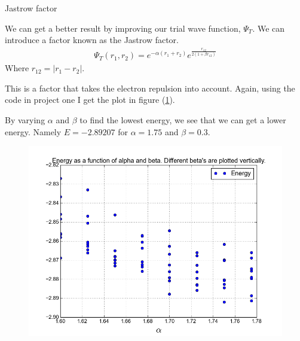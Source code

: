 \documentclass[a4paper, 12pt, titlepage]{article}
\begin{document}
\begin{section}{Jastrow factor}

 We can get a better result by improving our trial wave function, $\Psi_T$. We can introduce a factor known as the Jastrow factor. 
 \begin{align*}
 	\Psi_T(r_1,r_2) = e^{-\alpha(r_1 + r_2)}e^{\frac{r_{12}}{2(1+\beta r_{12})}}
 \end{align*}
 Where $r_{12} = |r_1 - r_2|$. 

 This is a factor that takes the electron repulsion into account. Again, using the code in project one I get the plot in figure (\ref{Helium3}).
 
 By varying $\alpha$ and $\beta$ to find the lowest energy, we see that we can get a lower energy. Namely $E = -2.89207$ for $\alpha = 1.75$ and $\beta = 0.3$. 

 \begin{figure}[H]
 	\centering
 	\includegraphics[width=\textwidth]{../python_programs/EnergyVariance_helium5.png}
 	\label{Helium3}
 \end{figure}

\end{section}
\end{document}
